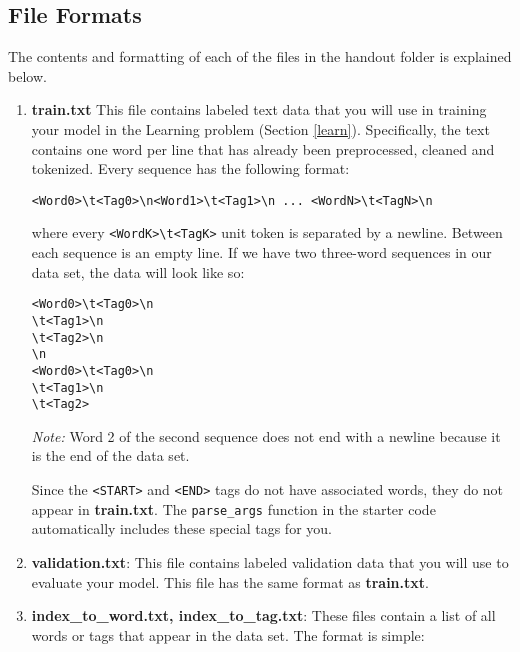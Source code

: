 \documentclass[11pt,addpoints,answers]{exam}
\begin{document}
\subsection{File Formats}\label{formats}
The contents and formatting of each of the files in the handout folder is explained below. 
\begin{enumerate}

\item \textbf{train.txt} This file contains labeled text data that you will use in training your model in the Learning problem (Section \ref{learn}). Specifically, the text contains one word per line that has already been preprocessed, cleaned and tokenized. Every sequence has the following format:

    \texttt{<Word0>\textbackslash t<Tag0>\textbackslash n<Word1>\textbackslash t<Tag1>\textbackslash n ... <WordN>\textbackslash t<TagN>\textbackslash n}

where every \texttt{<WordK>\textbackslash t<TagK>} unit token is separated by a newline. Between each sequence is an empty line. If we have two three-word sequences in our data set, the data will look like so:

    \texttt{<Word0>\textbackslash t<Tag0>\textbackslash n\\<Word1>\textbackslash t<Tag1>\textbackslash n\\<Word2>\textbackslash t<Tag2>\textbackslash n\\\textbackslash n\\}
    \texttt{<Word0>\textbackslash t<Tag0>\textbackslash n\\<Word1>\textbackslash t<Tag1>\textbackslash n\\<Word2>\textbackslash t<Tag2>}
    
\textit{Note:} Word 2 of the second sequence does not end with a newline because it is the end of the data set.

Since the \texttt{<START>} and \texttt{<END>} tags do not have associated words, they do not appear in \textbf{train.txt}. The \texttt{parse\_args} function in the starter code automatically includes these special tags for you.

\item \textbf{validation.txt}: This file contains labeled validation data that you will use to evaluate your model. This file has the same format as \textbf{train.txt}.
    
\item \textbf{index\_to\_word.txt, index\_to\_tag.txt}: These files contain a list of all words or tags that appear in the data set. The format is simple:


\end{enumerate}
\end{document}
